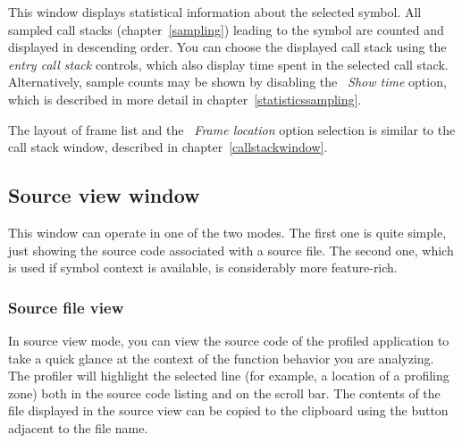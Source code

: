 \documentclass[hidelinks,titlepage,a4paper,twoside]{article}
\begin{document}
This window displays statistical information about the selected symbol. All sampled call stacks (chapter~\ref{sampling}) leading to the symbol are counted and displayed in descending order. You can choose the displayed call stack using the \emph{entry call stack} controls, which also display time spent in the selected call stack. Alternatively, sample counts may be shown by disabling the \emph{\faStopwatch{}~Show time} option, which is described in more detail in chapter~\ref{statisticssampling}.

The layout of frame list and the \emph{\faAt{}~Frame location} option selection is similar to the call stack window, described in chapter~\ref{callstackwindow}.

\subsection{Source view window}
\label{sourceview}

This window can operate in one of the two modes. The first one is quite simple, just showing the source code associated with a source file. The second one, which is used if symbol context is available, is considerably more feature-rich.

\subsubsection{Source file view}

In source view mode, you can view the source code of the profiled application to take a quick glance at the context of the function behavior you are analyzing. The profiler will highlight the selected line (for example, a location of a profiling zone) both in the source code listing and on the scroll bar. The contents of the file displayed in the source view can be copied to the clipboard using the button adjacent to the file name.
\end{document}
